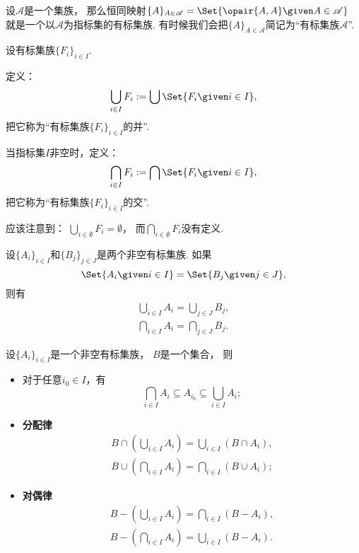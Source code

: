 \begin{example}
设\(\mathscr{A}\)是一个集族，
那么恒同映射\(\{A\}_{A \in \mathscr{A}} = \Set{ \opair{A,A} \given A \in \mathscr{A} }\)
就是一个以\(\mathscr{A}\)为指标集的有标集族.
有时候我们会把\(\{A\}_{A \in \mathscr{A}}\)简记为“有标集族\(\mathscr{A}\)”.
\end{example}

\begin{definition}
设有标集族\(\{F_i\}_{i \in I}\).

定义：\begin{equation}
	\bigcup_{i \in I} F_i
	\defeq
	\bigcup\Set{ F_i \given i \in I },
\end{equation}
把它称为“有标集族\(\{F_i\}_{i \in I}\)的并”.

当指标集\(I\)非空时，定义：
\begin{equation}
	\bigcap_{i \in I} F_i
	\defeq
	\bigcap\Set{ F_i \given i \in I },
\end{equation}
把它称为“有标集族\(\{F_i\}_{i \in I}\)的交”.
\end{definition}
应该注意到：
\(\bigcup_{i \in \emptyset} F_i = \emptyset\)，
而\(\bigcap_{i \in \emptyset} F_i\)没有定义.

\begin{theorem}
设\(\{A_i\}_{i \in I}\)和\(\{B_j\}_{j \in J}\)是两个非空有标集族.
如果\[
	\Set{ A_i \given i \in I }
	= \Set{ B_j \given j \in J },
\]
则有\begin{gather}
	\bigcup_{i \in I} A_i = \bigcup_{j \in J} B_j, \\
	\bigcap_{i \in I} A_i = \bigcap_{j \in J} B_j.
\end{gather}
\end{theorem}

\begin{theorem}
设\(\{A_i\}_{i \in I}\)是一个非空有标集族，
\(B\)是一个集合，
则\begin{itemize}
	\item 对于任意\(i_0 \in I\)，有\[
		\bigcap_{i \in I} A_i \subseteq A_{i_0} \subseteq \bigcup_{i \in I} A_i;
	\]

	\item {\rm\bf 分配律}\begin{gather*}
		B \cap \left( \bigcup_{i \in I} A_i \right)
		= \bigcup_{i \in I} \left( B \cap A_i \right), \\
		B \cup \left( \bigcap_{i \in I} A_i \right)
		= \bigcap_{i \in I} \left( B \cup A_i \right);
	\end{gather*}

	\item {\rm\bf 对偶律}\begin{gather*}
		B - \left( \bigcup_{i \in I} A_i \right)
		= \bigcap_{i \in I} \left( B - A_i \right), \\
		B - \left( \bigcap_{i \in I} A_i \right)
		= \bigcup_{i \in I} \left( B - A_i \right).
	\end{gather*}
\end{itemize}
\end{theorem}

